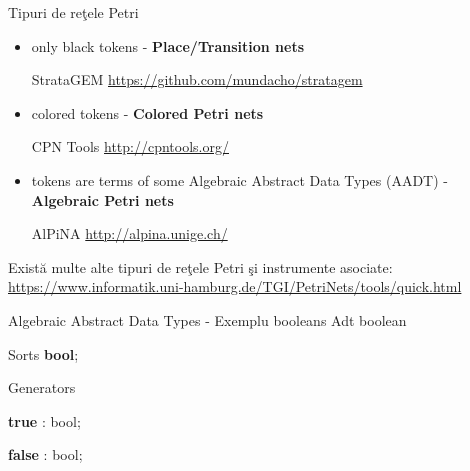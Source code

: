 \documentclass{beamer}
\begin{document}
\begin{frame}{Tipuri de reţele Petri}
\begin{itemize}
\item
only black tokens - \textbf{Place/Transition nets}

StrataGEM \url{https://github.com/mundacho/stratagem}
\item
colored tokens - \textbf{Colored Petri nets}

CPN Tools \url{http://cpntools.org/}
\item
tokens are terms of some Algebraic Abstract Data Types (AADT) - \textbf{Algebraic Petri nets}

AlPiNA \url{http://alpina.unige.ch/}
\end{itemize}

\vspace{0.5cm}

Există multe alte tipuri de reţele Petri şi instrumente asociate: \url{https://www.informatik.uni-hamburg.de/TGI/PetriNets/tools/quick.html}

\end{frame}



\begin{frame}{Algebraic Abstract Data Types - Exemplu booleans}
	Adt boolean
	
	Sorts \textbf{bool};
	
	Generators
	
\hspace{0.5cm}		\textbf{true} : bool;
		
\hspace{0.5cm}		\textbf{false} : bool;
		
		
		
		
		
		

\end{frame}
\end{document}
